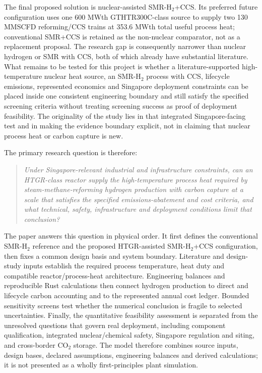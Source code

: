 The final proposed solution is nuclear-assisted SMR-H$_2$+CCS. Its preferred future configuration uses one 600 MWth GTHTR300C-class source to supply two 130 MMSCFD reforming/CCS trains at 353.6 MWth total useful process heat; conventional SMR+CCS is retained as the non-nuclear comparator, not as a replacement proposal. The research gap is consequently narrower than nuclear hydrogen or SMR with CCS, both of which already have substantial literature. What remains to be tested for this project is whether a literature-supported high-temperature nuclear heat source, an SMR-H$_2$ process with CCS, lifecycle emissions, represented economics and Singapore deployment constraints can be placed inside one consistent engineering boundary and still satisfy the specified screening criteria without treating screening success as proof of deployment feasibility. The originality of the study lies in that integrated Singapore-facing test and in making the evidence boundary explicit, not in claiming that nuclear process heat or carbon capture is new.

The primary research question is therefore:

\begin{quote}
\emph{Under Singapore-relevant industrial and infrastructure constraints, can an HTGR-class reactor supply the high-temperature process heat required by steam-methane-reforming hydrogen production with carbon capture at a scale that satisfies the specified emissions-abatement and cost criteria, and what technical, safety, infrastructure and deployment conditions limit that conclusion?}
\end{quote}

The paper answers this question in physical order. It first defines the conventional SMR-H$_2$ reference and the proposed HTGR-assisted SMR-H$_2$+CCS configuration, then fixes a common design basis and system boundary. Literature and design-study inputs establish the required process temperature, heat duty and compatible reactor/process-heat architecture. Engineering balances and reproducible Rust calculations then connect hydrogen production to direct and lifecycle carbon accounting and to the represented annual cost ledger. Bounded sensitivity screens test whether the numerical conclusion is fragile to selected uncertainties. Finally, the quantitative feasibility assessment is separated from the unresolved questions that govern real deployment, including component qualification, integrated nuclear/chemical safety, Singapore regulation and siting, and cross-border CO$_2$ storage. The model therefore combines source inputs, design bases, declared assumptions, engineering balances and derived calculations; it is not presented as a wholly first-principles plant simulation.